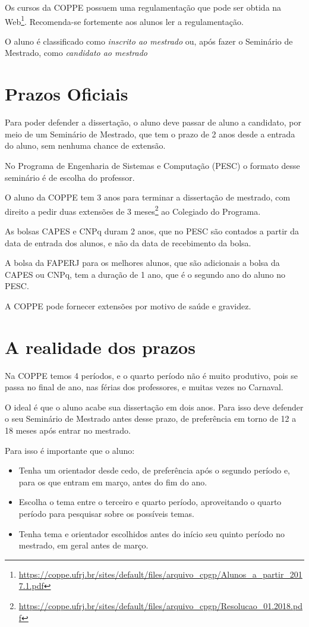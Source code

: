 \documentclass{book}
\begin{document}
Os cursos da COPPE possuem uma regulamentação que pode ser obtida na Web\footnote{\url{https://coppe.ufrj.br/sites/default/files/arquivo_cpgp/Alunos_a_partir_2017.1.pdf}}. Recomenda-se fortemente aos alunos ler a regulamentação.

O aluno é classificado como \textit{inscrito ao mestrado} ou, após fazer o Seminário de Mestrado, como \textit{candidato ao mestrado}

\section{Prazos Oficiais}

Para poder defender a dissertação, o aluno deve passar de aluno a candidato, por meio de um Seminário de Mestrado, que tem o prazo de 2 anos desde a entrada do aluno, sem nenhuma chance de extensão. 

No Programa de Engenharia de Sistemas e Computação (PESC) o formato desse seminário é de escolha do professor.

O aluno da COPPE tem 3 anos para terminar a dissertação de mestrado, com direito a pedir duas extensões de 3 meses\footnote{\url{https://coppe.ufrj.br/sites/default/files/arquivo_cpgp/Resolucao_01.2018.pdf}} ao Colegiado do Programa.

As bolsas CAPES e CNPq duram 2 anos, que no PESC são contados a partir da data de entrada dos alunos, e não da data de recebimento da bolsa.

A bolsa da FAPERJ para os melhores alunos, que são adicionais a bolsa da CAPES ou CNPq, tem a duração de 1 ano, que é o segundo ano do aluno no PESC.

A COPPE pode fornecer extensões por motivo de saúde e gravidez.

\section{A realidade dos prazos}

Na COPPE temos 4 períodos, e o quarto período não é muito produtivo, pois se passa no final de ano, nas férias dos professores, e muitas vezes no Carnaval.

O ideal é que o aluno acabe sua dissertação em dois anos. Para isso deve defender o seu Seminário de Mestrado antes desse prazo, de preferência em torno de 12 a 18 meses após entrar no mestrado.

Para isso é importante que o aluno:
\begin{itemize}
    \item Tenha um orientador desde cedo, de preferência após o segundo período e, para os que entram em março, antes do fim do ano.
    \item Escolha o tema entre o terceiro e quarto período, aproveitando o quarto período para pesquisar sobre os possíveis temas.
    \item Tenha  tema e orientador escolhidos antes do início seu quinto período no mestrado, em geral antes de março.
\end{itemize}
\end{document}
